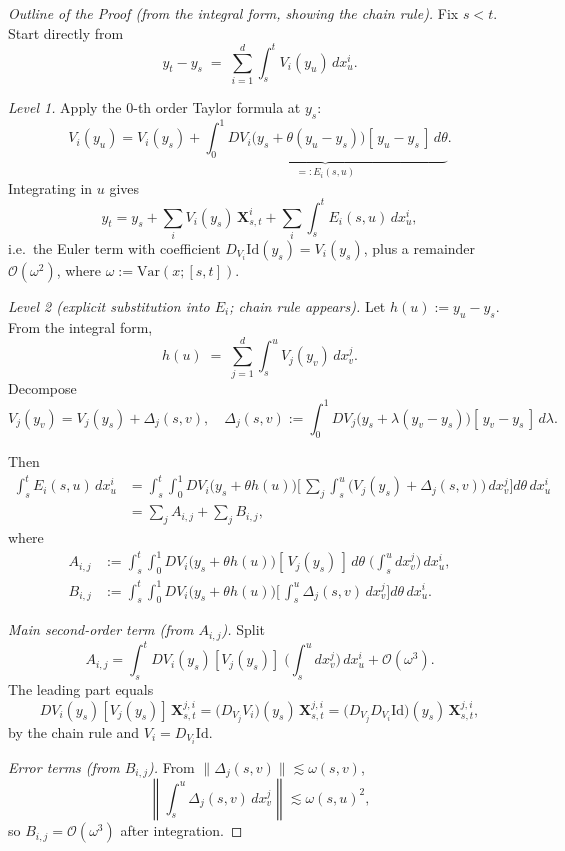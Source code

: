 \documentclass[12pt]{article}
\begin{document}
\begin{proof}[Outline of the Proof (from the integral form, showing the chain rule)]
Fix $s<t$. Start directly from
\[
y_t-y_s \;=\; \sum_{i=1}^d \int_s^t V_i(y_u)\,dx_u^i.
\]

\emph{Level 1.}  
Apply the $0$-th order Taylor formula at $y_s$:
\[
V_i(y_u)
= V_i(y_s) 
+ \underbrace{\int_0^1 
    DV_i\!\big(y_s+\theta(y_u-y_s)\big)
    [\,y_u-y_s\,]\,d\theta}_{=:E_i(s,u)}.
\]
Integrating in $u$ gives
\[
y_t
= y_s + \sum_i V_i(y_s)\,\mathbf X^i_{s,t} 
  + \sum_i \int_s^t E_i(s,u)\,dx_u^i,
\]
i.e.\ the Euler term with coefficient 
$D_{V_i}\mathrm{Id}(y_s) = V_i(y_s)$,  
plus a remainder $\mathcal O(\omega^2)$,  
where $\omega := \mathrm{Var}(x;[s,t])$.

\medskip
\emph{Level 2 (explicit substitution into $E_i$; chain rule appears).}  
Let $h(u) := y_u-y_s$.  
From the integral form,
\[
h(u) \;=\; \sum_{j=1}^d \int_s^u V_j(y_v)\,dx_v^j.
\]
Decompose
\[
V_j(y_v)
= V_j(y_s) + \Delta_j(s,v),
\quad
\Delta_j(s,v)
:= \int_0^1 DV_j\!\big(y_s+\lambda(y_v-y_s)\big)
   [\,y_v-y_s\,]\,d\lambda.
\]

Then
\begin{align*}
\int_s^t E_i(s,u)\,dx_u^i
&= \int_s^t \!\int_0^1 
       DV_i\!\big(y_s+\theta h(u)\big)
       \Big[\,\sum_j \int_s^u 
             \big(V_j(y_s)+\Delta_j(s,v)\big)\,dx_v^j
       \Big]
     d\theta\,dx_u^i \\
&= \sum_j A_{i,j} + \sum_j B_{i,j},
\end{align*}
where
\begin{align*}
A_{i,j} 
&:= \int_s^t \!\int_0^1 
       DV_i\!\big(y_s+\theta h(u)\big)
       [\,V_j(y_s)\,]\,d\theta 
       \;\Big(\int_s^u dx_v^j\Big)\,dx_u^i, \\
B_{i,j} 
&:= \int_s^t \!\int_0^1 
       DV_i\!\big(y_s+\theta h(u)\big)
       \Big[\,\int_s^u \Delta_j(s,v)\,dx_v^j\Big]
       d\theta\,dx_u^i.
\end{align*}

\smallskip
\noindent\textit{Main second-order term (from $A_{i,j}$).}  
Split
\[
A_{i,j}
= \int_s^t DV_i(y_s)[V_j(y_s)]
    \;\Big(\int_s^u dx_v^j\Big)\,dx_u^i
 + \mathcal O(\omega^3).
\]
The leading part equals
\[
DV_i(y_s)[V_j(y_s)]\,\mathbf X^{j,i}_{s,t}
= \big(D_{V_j}V_i\big)(y_s)\,\mathbf X^{j,i}_{s,t}
= \big(D_{V_j}D_{V_i}\mathrm{Id}\big)(y_s)\,\mathbf X^{j,i}_{s,t},
\]
by the chain rule and $V_i = D_{V_i}\mathrm{Id}$.

\smallskip
\noindent\textit{Error terms (from $B_{i,j}$).}  
From $\|\Delta_j(s,v)\| \lesssim \omega(s,v)$,  
\[
\left\|\int_s^u \Delta_j(s,v)\,dx_v^j\right\| 
\lesssim \omega(s,u)^2,
\]
so $B_{i,j} = \mathcal O(\omega^3)$ after integration.


\end{proof}
\end{document}
